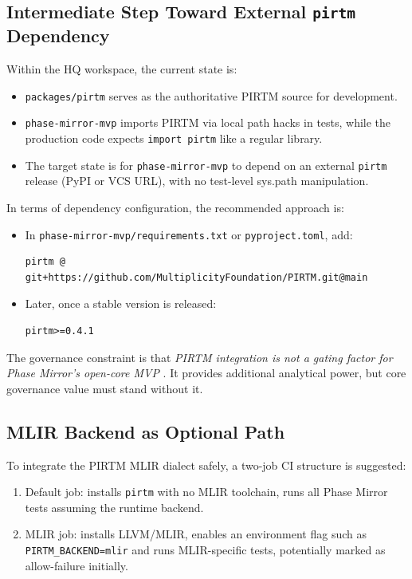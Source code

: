 \documentclass[11pt]{article}
\begin{document}
\subsection{Intermediate Step Toward External \texorpdfstring{\texttt{pirtm}}{pirtm} Dependency}

Within the HQ workspace, the current state is:
\begin{itemize}
  \item \texttt{packages/pirtm} serves as the authoritative PIRTM source for development.
  \item \texttt{phase-mirror-mvp} imports PIRTM via local path hacks in tests, while the production code expects \texttt{import pirtm} like a regular library.
  \item The target state is for \texttt{phase-mirror-mvp} to depend on an external \texttt{pirtm} release (PyPI or VCS URL), with no test-level sys.path manipulation.
\end{itemize}

In terms of dependency configuration, the recommended approach is:
\begin{itemize}
  \item In \texttt{phase-mirror-mvp/requirements.txt} or \texttt{pyproject.toml}, add:
\begin{lstlisting}[style=code]
pirtm @ git+https://github.com/MultiplicityFoundation/PIRTM.git@main
\end{lstlisting}
  \item Later, once a stable version is released:
\begin{lstlisting}[style=code]
pirtm>=0.4.1
\end{lstlisting}
\end{itemize}

The governance constraint is that \emph{PIRTM integration is not a gating factor for Phase Mirror's open-core MVP} \cite{pm-mvp-analysis}. It provides additional analytical power, but core governance value must stand without it.

\subsection{MLIR Backend as Optional Path}

To integrate the PIRTM MLIR dialect safely, a two-job CI structure is suggested:
\begin{enumerate}[label=(\roman*)]
  \item Default job: installs \texttt{pirtm} with no MLIR toolchain, runs all Phase Mirror tests assuming the runtime backend.
  \item MLIR job: installs LLVM/MLIR, enables an environment flag such as \verb|PIRTM_BACKEND=mlir| and runs MLIR-specific tests, potentially marked as allow-failure initially.
\end{enumerate}
\end{document}

